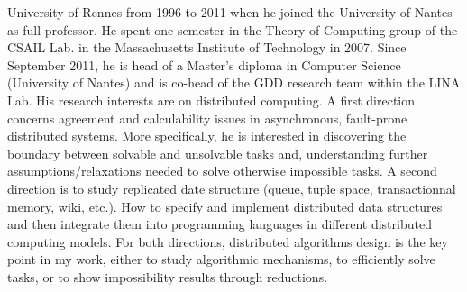 University of Rennes from 1996 to 2011 when he joined the University of Nantes
as full professor. He spent one semester in the Theory of Computing group of the
CSAIL Lab. in the Massachusetts Institute of Technology in 2007. Since September
2011, he is head of a Master's diploma in Computer Science (University of
Nantes) and is co-head of the GDD research team within the LINA Lab.  His
research interests are on distributed computing. A first direction concerns
agreement and calculability issues in asynchronous, fault-prone distributed
systems. More specifically, he is interested in discovering the boundary between
solvable and unsolvable tasks and, understanding further assumptions/relaxations
needed to solve otherwise impossible tasks. A second direction is to study
replicated date structure (queue, tuple space, transactionnal memory, wiki,
etc.). How to specify and implement distributed data structures and then
integrate them into programming languages in different distributed computing
models. For both directions, distributed algorithms design is the key point in
my work, either to study algorithmic mechanisms, to efficiently solve tasks, or
to show impossibility results through reductions.


